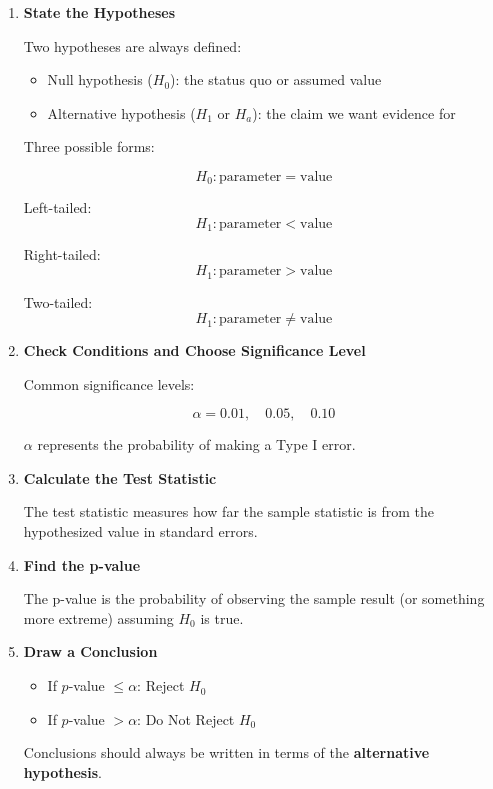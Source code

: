 \documentclass[11pt]{article}
\begin{document}
\begin{enumerate}

\item \textbf{State the Hypotheses}

Two hypotheses are always defined:

\begin{itemize}
\item Null hypothesis ($H_0$): the status quo or assumed value
\item Alternative hypothesis ($H_1$ or $H_a$): the claim we want evidence for
\end{itemize}

Three possible forms:

\[
H_0: \text{parameter} = \text{value}
\]

Left-tailed:
\[
H_1: \text{parameter} < \text{value}
\]

Right-tailed:
\[
H_1: \text{parameter} > \text{value}
\]

Two-tailed:
\[
H_1: \text{parameter} \neq \text{value}
\]

\item \textbf{Check Conditions and Choose Significance Level}

Common significance levels:

\[
\alpha = 0.01, \quad 0.05, \quad 0.10
\]

$\alpha$ represents the probability of making a Type I error.

\item \textbf{Calculate the Test Statistic}

The test statistic measures how far the sample statistic is from the hypothesized value in standard errors.

\item \textbf{Find the p-value}

The p-value is the probability of observing the sample result (or something more extreme) assuming $H_0$ is true.

\item \textbf{Draw a Conclusion}

\begin{itemize}
\item If $p$-value $\leq \alpha$: Reject $H_0$
\item If $p$-value $> \alpha$: Do Not Reject $H_0$
\end{itemize}

Conclusions should always be written in terms of the \textbf{alternative hypothesis}.

\end{enumerate}
\end{document}
